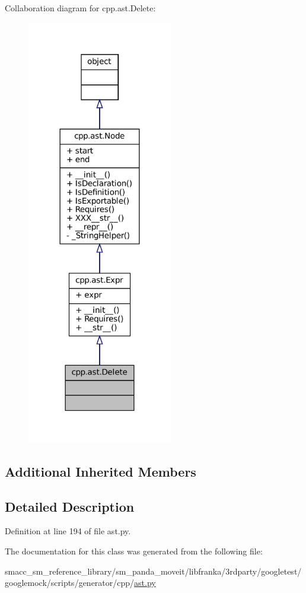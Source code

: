 Collaboration diagram for cpp.\+ast.\+Delete\+:
\nopagebreak
\begin{figure}[H]
\begin{center}
\leavevmode
\includegraphics[width=180pt]{classcpp_1_1ast_1_1Delete__coll__graph}
\end{center}
\end{figure}
\subsection*{Additional Inherited Members}


\subsection{Detailed Description}


Definition at line 194 of file ast.\+py.



The documentation for this class was generated from the following file\+:\begin{DoxyCompactItemize}
\item 
smacc\+\_\+sm\+\_\+reference\+\_\+library/sm\+\_\+panda\+\_\+moveit/libfranka/3rdparty/googletest/googlemock/scripts/generator/cpp/\hyperlink{ast_8py}{ast.\+py}\end{DoxyCompactItemize}
